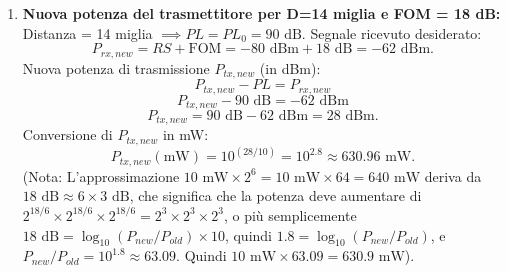 \documentclass[12pt,a4paper]{article}
\begin{document}
\begin{enumerate}[label=\textbf{\arabic*.}, wide, labelindent=0pt, leftmargin=*]
\begin{enumerate}[label=\alph*), wide, labelindent=0pt, leftmargin=*]
        \item \textbf{Nuova potenza del trasmettitore per D=14 miglia e FOM = 18 dB:}
        Distanza = 14 miglia $\implies PL = PL_0 = 90 \text{ dB}$.
        Segnale ricevuto desiderato:
        \[ P_{rx,new} = RS + \text{FOM} = -80 \text{ dBm} + 18 \text{ dB} = -62 \text{ dBm}. \]
        Nuova potenza di trasmissione $P_{tx,new}$ (in dBm):
        \[ P_{tx,new} - PL = P_{rx,new} \]
        \[ P_{tx,new} - 90 \text{ dB} = -62 \text{ dBm} \]
        \[ P_{tx,new} = 90 \text{ dB} - 62 \text{ dBm} = 28 \text{ dBm}. \]
        Conversione di $P_{tx,new}$ in mW:
        \[ P_{tx,new} (\text{mW}) = 10^{(28/10)} = 10^{2.8} \approx 630.96 \text{ mW}. \]
        (Nota: L'approssimazione $10 \text{ mW} \times 2^6 = 10 \text{ mW} \times 64 = 640 \text{ mW}$ deriva da $18 \text{ dB} \approx 6 \times 3 \text{ dB}$, che significa che la potenza deve aumentare di $2^{18/6} \times 2^{18/6} \times 2^{18/6} = 2^3 \times 2^3 \times 2^3$, o più semplicemente $18 \text{ dB} = \log_{10}(P_{new}/P_{old}) \times 10$, quindi $1.8 = \log_{10}(P_{new}/P_{old})$, e $P_{new}/P_{old} = 10^{1.8} \approx 63.09$. Quindi $10 \text{ mW} \times 63.09 = 630.9 \text{ mW}$).
    \end{enumerate}

\end{enumerate}
\end{document}
